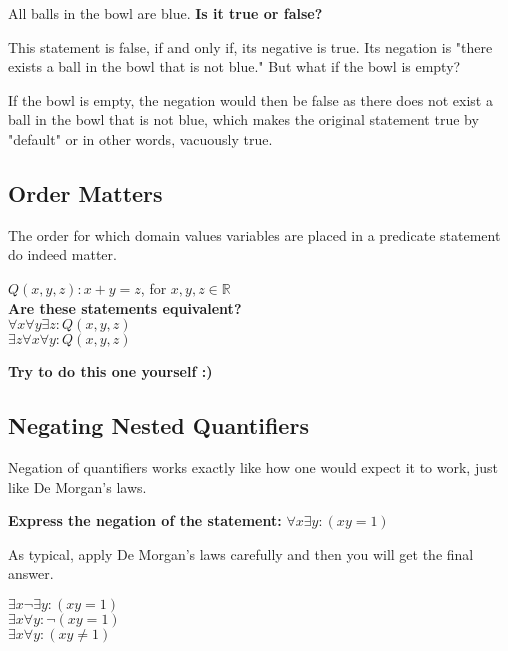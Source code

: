 \begin{example}
    All balls in the bowl are blue. \textbf{Is it true or false?}
\end{example}

This statement is false, if and only if, its negative is true. Its negation is "there exists a ball in the bowl that is not blue." But what if the bowl is empty?

If the bowl is empty, the negation would then be false as there does not exist a ball in the bowl that is not blue, which makes the original statement true by "default" or in other words, vacuously true.

\subsection{Order Matters}
The order for which domain values variables are placed in a predicate statement do indeed matter.

\begin{example}
    $Q(x,y,z): x+y=z$, for $x,y,z \in \mathbb{R}$\\
    \textbf{Are these statements equivalent?}\\
    $\forall x \forall y \exists z: Q(x,y,z)$\\
    $\exists z \forall x \forall y: Q(x,y,z)$
\end{example}

\textbf{Try to do this one yourself :)}

\subsection{Negating Nested Quantifiers}
Negation of quantifiers works exactly like how one would expect it to work, just like De Morgan's laws.

\begin{example}
    \textbf{Express the negation of the statement: }$\forall x \exists y: (xy=1)$ 
\end{example}

As typical, apply De Morgan's laws carefully and then you will get the final answer.

\begin{center}
    $\exists x \neg \exists y: (xy=1)$\\
    $\exists x \forall y: \neg (xy=1)$\\
    $\exists x \forall y: (xy\neq 1)$
\end{center}